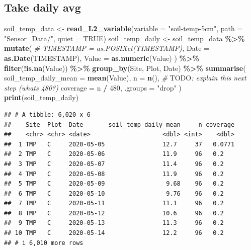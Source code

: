 \documentclass[
]{article}
\newenvironment{Shaded}{\begin{snugshade}}{\end{snugshade}}
\newcommand{\AlertTok}[1]{\textcolor[rgb]{0.94,0.16,0.16}{#1}}
\newcommand{\AttributeTok}[1]{\textcolor[rgb]{0.13,0.29,0.53}{#1}}
\newcommand{\CommentTok}[1]{\textcolor[rgb]{0.56,0.35,0.01}{\textit{#1}}}
\newcommand{\ConstantTok}[1]{\textcolor[rgb]{0.56,0.35,0.01}{#1}}
\newcommand{\DecValTok}[1]{\textcolor[rgb]{0.00,0.00,0.81}{#1}}
\newcommand{\FunctionTok}[1]{\textcolor[rgb]{0.13,0.29,0.53}{\textbf{#1}}}
\newcommand{\NormalTok}[1]{#1}
\newcommand{\OtherTok}[1]{\textcolor[rgb]{0.56,0.35,0.01}{#1}}
\newcommand{\SpecialCharTok}[1]{\textcolor[rgb]{0.81,0.36,0.00}{\textbf{#1}}}
\newcommand{\StringTok}[1]{\textcolor[rgb]{0.31,0.60,0.02}{#1}}
\begin{document}
\subsection{Take daily avg}\label{take-daily-avg}

\begin{Shaded}
\begin{Highlighting}[]
\NormalTok{soil\_temp\_data }\OtherTok{\textless{}{-}} \FunctionTok{read\_L2\_variable}\NormalTok{(}\AttributeTok{variable =} \StringTok{"soil{-}temp{-}5cm"}\NormalTok{,}
                                   \AttributeTok{path =} \StringTok{"Sensor\_Data/"}\NormalTok{, }\AttributeTok{quiet =} \ConstantTok{TRUE}\NormalTok{)}
\NormalTok{soil\_temp\_daily }\OtherTok{\textless{}{-}}\NormalTok{ soil\_temp\_data }\SpecialCharTok{\%\textgreater{}\%}
  \FunctionTok{mutate}\NormalTok{(}
\CommentTok{\#    TIMESTAMP = as.POSIXct(TIMESTAMP),}
    \AttributeTok{Date =} \FunctionTok{as.Date}\NormalTok{(TIMESTAMP),}
    \AttributeTok{Value =} \FunctionTok{as.numeric}\NormalTok{(Value) ) }\SpecialCharTok{\%\textgreater{}\%}
  \FunctionTok{filter}\NormalTok{(}\SpecialCharTok{!}\FunctionTok{is.na}\NormalTok{(Value)) }\SpecialCharTok{\%\textgreater{}\%}  
  \FunctionTok{group\_by}\NormalTok{(Site, Plot, Date) }\SpecialCharTok{\%\textgreater{}\%}
  \FunctionTok{summarise}\NormalTok{(}
    \AttributeTok{soil\_temp\_daily\_mean =} \FunctionTok{mean}\NormalTok{(Value),}
    \AttributeTok{n =} \FunctionTok{n}\NormalTok{(),}
    \CommentTok{\# }\AlertTok{TODO}\CommentTok{: explain this next step (what\textquotesingle{}s 480?)}
    \AttributeTok{coverage =}\NormalTok{ n }\SpecialCharTok{/} \DecValTok{480}\NormalTok{,      }
    \AttributeTok{.groups =} \StringTok{"drop"}\NormalTok{  )}
\FunctionTok{print}\NormalTok{(soil\_temp\_daily)}
\end{Highlighting}
\end{Shaded}

\begin{verbatim}
## # A tibble: 6,020 x 6
##    Site  Plot  Date       soil_temp_daily_mean     n coverage
##    <chr> <chr> <date>                    <dbl> <int>    <dbl>
##  1 TMP   C     2020-05-05                12.7     37   0.0771
##  2 TMP   C     2020-05-06                11.9     96   0.2   
##  3 TMP   C     2020-05-07                11.4     96   0.2   
##  4 TMP   C     2020-05-08                11.9     96   0.2   
##  5 TMP   C     2020-05-09                 9.68    96   0.2   
##  6 TMP   C     2020-05-10                 9.76    96   0.2   
##  7 TMP   C     2020-05-11                11.1     96   0.2   
##  8 TMP   C     2020-05-12                10.6     96   0.2   
##  9 TMP   C     2020-05-13                11.3     96   0.2   
## 10 TMP   C     2020-05-14                12.2     96   0.2   
## # i 6,010 more rows
\end{verbatim}
\end{document}
